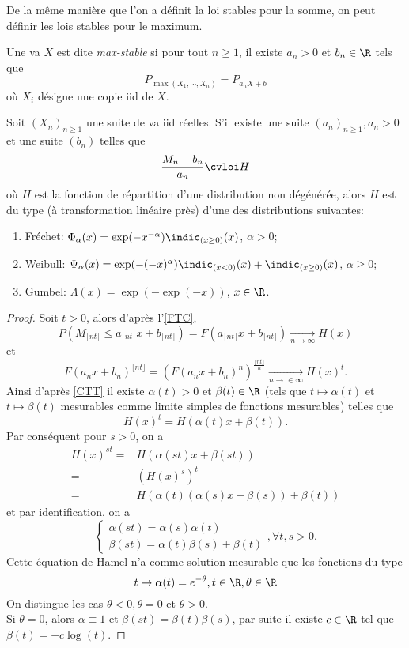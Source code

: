 \documentclass[10p,a4paper,reqno,titlepage]{report}
\begin{document}
De la même manière que l'on a définit la loi stables pour la somme, on peut définir les lois stables pour le maximum.
\begin{de}
	Une va $X$ est dite \textit{max-stable} si pour tout $n \geq 1$, il existe $a_n >0$ et $b_n \in \R$ tels que 
	$$P_{\max(X_1,\cdots,X_n)} =P_{a_n X +b}$$
	où $X_i$ désigne une copie iid de $X$.
\end{de}
\begin{thm}
Soit $(X_n)_{n\geq 1}$ une suite de va iid réelles. S'il existe une suite $(a_n)_{n\geq 1}, a_n >0$ et une suite $(b_n)$ telles que 
\begin{align} \frac{M_n - b_n}{a_n} \cvloi H  \label{FTC}
\end{align}
où $H$ est la fonction de répartition d'une distribution non dégénérée, alors $H$ est du type (à transformation linéaire près) d'une des distributions suivantes:\
\begin{enumerate}
	\item Fréchet: $\Phi_\alpha (x)= \exp(-x^{-\alpha}) \indic_{(x\geq 0)} (x)$, $\alpha >0$;
	\item Weibull: $\Psi_\alpha (x) = \exp(-(-x)^\alpha) \indic_{(x<0)}(x) + \indic_{(x \geq 0)}(x)$, $\alpha \geq 0$;
	\item Gumbel: $\Lambda(x)= \exp(-\exp(-x))$, $x\in \R$.
\end{enumerate}
\end{thm}	
\begin{proof}
	Soit $t >0$, alors d'après l'\autoref{FTC},
	$$P(M_{\lfloor nt \rfloor} \leq a_{\lfloor nt \rfloor} x + b_{\lfloor nt \rfloor}) = F(a_{\lfloor nt \rfloor} x + b_{\lfloor nt \rfloor}) \underset{n\to \infty}{\longrightarrow} H(x)$$
	et
	$$F(a_n x +b_n)^{\lfloor nt \rfloor} = \left( F(a_n x +b_n)^n\right)^{\frac{\lfloor nt \rfloor}{n}} \underset{n\to\in\infty}{\longrightarrow} H(x)^t.$$
	Ainsi d'après \autoref{CTT} il existe $\alpha(t)>0$ et $\beta(t)\in\R$ (tels que $t \mapsto \alpha(t)$ et $t \mapsto \beta(t)$ mesurables comme limite simples de fonctions mesurables) telles que 
	$$ H(x)^t = H(\alpha(t)x +\beta(t)).$$
	Par conséquent pour $s>0$, on a 
	\begin{align*}
		H(x)^{st} = &  H(\alpha(st)x + \beta(st))\\
		= & (H(x)^s )^t \\
		= & H(\alpha(t)(\alpha(s)x +\beta(s))+\beta(t))
	\end{align*}
et par identification, on a 
$$\left\{ \begin{array}{l}
	\alpha(st) = \alpha(s)\alpha(t)\\
	\beta(st)= \alpha(t)\beta(s)+\beta(t)
\end{array}\right. ,\forall t,s >0.$$
Cette équation de Hamel n'a comme solution mesurable que les fonctions du type
$$ t \mapsto \alpha(t)= e^{-\theta}, t \in \R, \theta\in\R$$
On distingue les cas $\theta<0, \theta =0$ et $\theta >0$. \\
Si $\theta =0$, alors $\alpha \equiv 1$ et $\beta(st)=\beta(t)\beta(s)$, par suite il existe $c \in\R$ tel que $\beta(t)=- c \log(t)$.
\end{proof}
\end{document}
